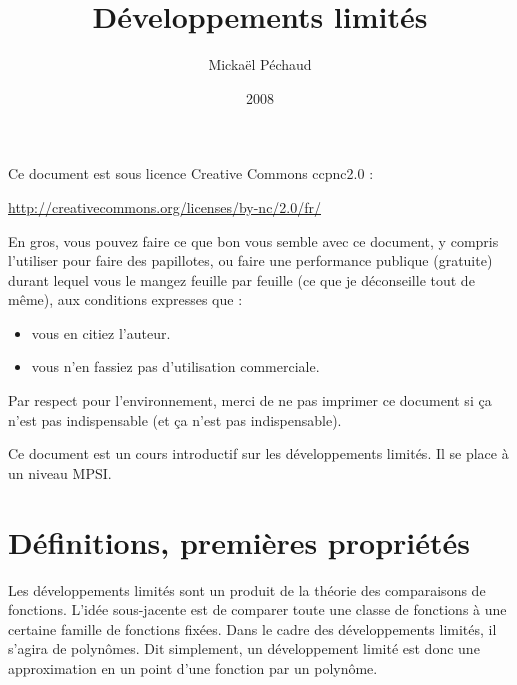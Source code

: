 \documentclass[12pt]{article}
\begin{document}
\renewcommand{\labelitemi}{\textbullet}

\date{2008}
  \title{Développements limités}
  \author{Mickaël Péchaud}
  
  \maketitle
  
  \tableofcontents


\newpage
Ce document est sous licence Creative Commons ccpnc2.0 :


\href{http://creativecommons.org/licenses/by-nc/2.0/fr/}{http://creativecommons.org/licenses/by-nc/2.0/fr/} 


En gros, vous pouvez faire ce que bon vous semble avec ce document, y
compris l'utiliser pour faire des papillotes, ou faire une performance
publique (gratuite) durant lequel vous le mangez feuille par feuille (ce
que je déconseille tout de même), aux conditions expresses que :



\begin{itemize}
\item vous en citiez l'auteur.

\item vous n'en fassiez pas d'utilisation commerciale.
\end{itemize}

\bigskip

Par respect pour l'environnement, merci de ne pas imprimer ce document si
ça n'est pas indispensable (et ça n'est pas indispensable).

\newpage

Ce document est un cours introductif sur les développements limités. Il se place à
un niveau MPSI.


\;



\newpage

\section{Définitions, premières propriétés}

Les développements limités sont un produit de la théorie des comparaisons
de fonctions. L'idée sous-jacente est de comparer toute une classe de
fonctions à une certaine famille de fonctions fixées. Dans le cadre des
développements limités, il s'agira de polynômes. Dit simplement, un
développement limité est donc une approximation en un point d'une fonction
par un polynôme.
\end{document}
